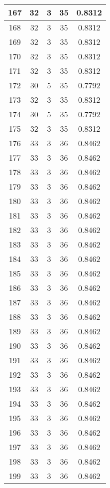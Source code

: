 \documentclass[letterpaper, 12pt]{article}
\begin{document}
\begin{longtable}{|c|c|c|c|c|}
\hline
167 & 32 & 3 & 35 & 0.8312 \\
\hline
168 & 32 & 3 & 35 & 0.8312 \\
\hline
169 & 32 & 3 & 35 & 0.8312 \\
\hline
170 & 32 & 3 & 35 & 0.8312 \\
\hline
171 & 32 & 3 & 35 & 0.8312 \\
\hline
172 & 30 & 5 & 35 & 0.7792 \\
\hline
173 & 32 & 3 & 35 & 0.8312 \\
\hline
174 & 30 & 5 & 35 & 0.7792 \\
\hline
175 & 32 & 3 & 35 & 0.8312 \\
\hline
176 & 33 & 3 & 36 & 0.8462 \\
\hline
177 & 33 & 3 & 36 & 0.8462 \\
\hline
178 & 33 & 3 & 36 & 0.8462 \\
\hline
179 & 33 & 3 & 36 & 0.8462 \\
\hline
180 & 33 & 3 & 36 & 0.8462 \\
\hline
181 & 33 & 3 & 36 & 0.8462 \\
\hline
182 & 33 & 3 & 36 & 0.8462 \\
\hline
183 & 33 & 3 & 36 & 0.8462 \\
\hline
184 & 33 & 3 & 36 & 0.8462 \\
\hline
185 & 33 & 3 & 36 & 0.8462 \\
\hline
186 & 33 & 3 & 36 & 0.8462 \\
\hline
187 & 33 & 3 & 36 & 0.8462 \\
\hline
188 & 33 & 3 & 36 & 0.8462 \\
\hline
189 & 33 & 3 & 36 & 0.8462 \\
\hline
190 & 33 & 3 & 36 & 0.8462 \\
\hline
191 & 33 & 3 & 36 & 0.8462 \\
\hline
192 & 33 & 3 & 36 & 0.8462 \\
\hline
193 & 33 & 3 & 36 & 0.8462 \\
\hline
194 & 33 & 3 & 36 & 0.8462 \\
\hline
195 & 33 & 3 & 36 & 0.8462 \\
\hline
196 & 33 & 3 & 36 & 0.8462 \\
\hline
197 & 33 & 3 & 36 & 0.8462 \\
\hline
198 & 33 & 3 & 36 & 0.8462 \\
\hline
199 & 33 & 3 & 36 & 0.8462 \\
\hline
\end{longtable}
\end{document}

